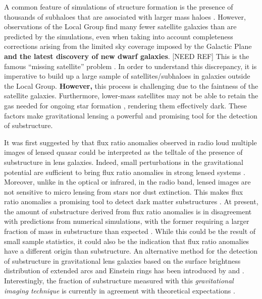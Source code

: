 \documentclass[useAMS,usenatbib]{mn2e}
\begin{document}
A common feature of simulations of structure formation is the presence
of thousands of subhaloes that are associated with larger mass haloes \citep[e.g.][]{Springel08}.
However, observations of the Local Group find many fewer satellite
galaxies than are predicted by the simulations, even when taking into
account completeness corrections arising from the limited sky coverage
imposed by the Galactic Plane {\bf and the latest discovery of new dwarf galaxies}. [NEED REF]  
This is the famous ``missing satellite'' problem \citep{Klypin1999, Moore1999, S07}. In order to
understand this discrepancy, it is imperative to build up a large
sample of satellites/subhaloes in galaxies outside the Local Group.
{\bf However,} this process is challenging due to the faintness of the satellite
galaxies.  Furthermore, lower-mass satellites may not be able to
retain the gas needed for ongoing star formation \citep[e.g.,][]{P11},
rendering them effectively dark.  These factors make gravitational
lensing a powerful and promising tool for the detection of
substructure.

It was first suggested by \citet{Mao1998} that flux ratio anomalies observed in radio loud multiple images of lensed quasar could be interpreted as the telltale of the presence of substructure in lens galaxies.
Indeed, small perturbations in the gravitational potential are
sufficient to bring flux ratio anomalies in strong lensed systems \citep{Bradac02}. 
Moreover, unlike in the optical or infrared, in the radio band, lensed
images are not sensitive to micro lensing from stars nor dust
extinction. This makes flux ratio anomalies a promising tool to
detect dark matter substructures \citep{Dalal2002, N13}.  At present,
the amount of substructure derived from flux ratio anomalies is in
disagreement with predictions from numerical simulations, with the
former requiring a larger fraction of mass in substructure than
expected \citet{Xu14}. While this could be the result of small sample
statistics, it could also be the indication that flux ratio anomalies
have a different origin than substructure. 
%
An alternative method for
the detection of substructure in gravitational lens galaxies based on
the surface brightness distribution of extended arcs and Einstein rings
has been introduced by \citet{K05} and \citet{V09}. Interestingly, the fraction of
substructure measured with this \emph{gravitational imaging technique}
is currently in agreement with theoretical expectations \citep{V14a}.
\end{document}
